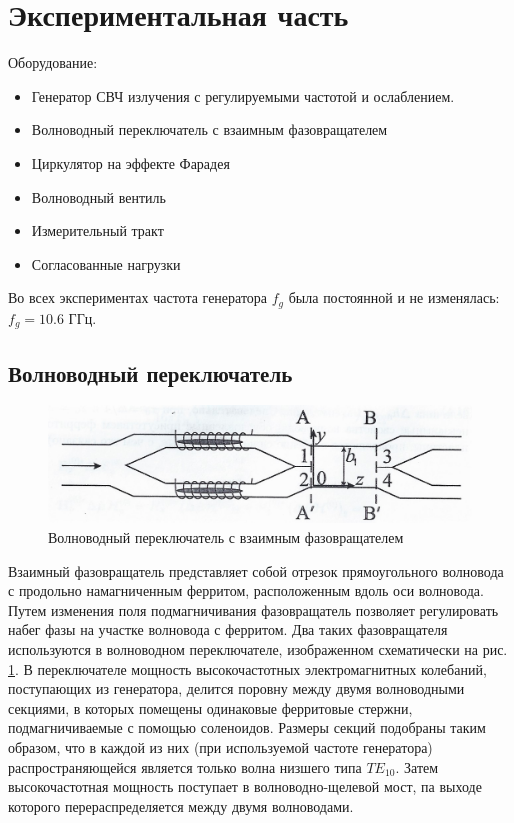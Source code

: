 \newpage
\section{Экспериментальная часть}

Оборудование: 
\begin{itemize}
    \item Генератор СВЧ излучения с регулируемыми частотой и ослаблением.
    \item Волноводный переключатель с взаимным фазовращателем
    \item Циркулятор на эффекте Фарадея
    \item Волноводный вентиль
    \item Измерительный тракт
    \item Согласованные нагрузки
\end{itemize}
Во всех экспериментах частота генератора $f_g$ была постоянной и не изменялась: $f_g = 10.6$ ГГц.
\subsection{Волноводный переключатель}
\begin{figure}[h!]
    \centering
    \includegraphics[width = 0.7\linewidth]{imgs/temp/003.jpg}
    \caption{Волноводный переключатель с взаимным фазовращателем}
    \label{fig:ex:1}
\end{figure}
Взаимный фазовращатель представляет собой отрезок прямоугольного волновода с продольно намагниченным ферритом,
расположенным вдоль оси волновода. Путем изменения поля подмагничивания фазовращатель
позволяет регулировать набег фазы на участке волновода с ферритом. Два таких фазовращателя используются в волноводном
переключателе, изображенном схематически на рис. \ref{fig:ex:1}. 
В переключателе мощность высокочастотных электромагнитных колебаний, поступающих из генератора, делится поровну между двумя волноводными секциями, в которых помещены одинаковые ферритовые стержни, подмагничиваемые с помощью соленоидов. Размеры секций подобраны таким образом, что в каждой из них (при используемой частоте генератора) распространяющейся является только волна низшего типа $TE_{10}$. Затем высокочастотная мощность поступает в волноводно-щелевой мост, па выходе которого перераспределяется между двумя волноводами.

